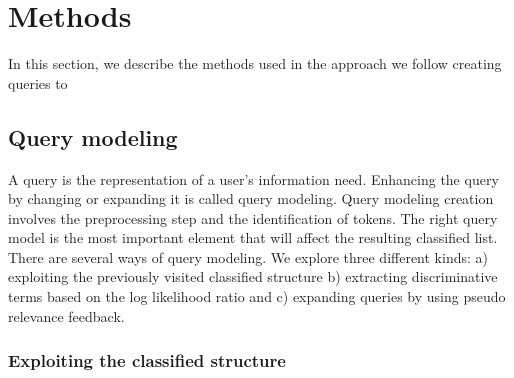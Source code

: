 \chapter{Methods}

In this section, we describe the methods used in the approach we follow creating queries to 

\section{Query modeling}

A query is the representation of a user's information need. Enhancing the query by changing or expanding it is called query modeling. Query modeling creation involves the preprocessing step and the identification of tokens. The right query model is the most important element that will affect the resulting classified list. There are several ways of query modeling. We explore three different kinds: a) exploiting the previously visited classified structure b) extracting discriminative terms based on the log likelihood ratio and c) expanding queries by using pseudo relevance feedback.

\subsection{Exploiting the classified structure}

